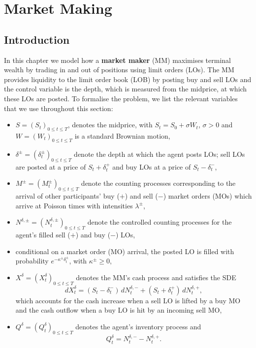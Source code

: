 \documentclass[11pt, a4paper]{book}
\begin{document}
	
	\setcounter{chapter}{9} %
	\chapter{Market Making}
	
	\section{Introduction}
	
	In this chapter we model how a \textbf{market maker} (MM) maximises terminal wealth by trading in and out of positions using limit orders (LOs). The MM provides liquidity to the limit order book (LOB) by posting buy and sell LOs and the control variable is the depth, which is measured from the midprice, at which these LOs are posted. To formalise the problem, we list the relevant variables that we use throughout this section:
	
	\begin{itemize}
		\item $S = (S_t)_{0 \leq t \leq T}$, denotes the midprice, with $S_t = S_0 + \sigma W_t$, $\sigma > 0$ and $W = (W_t)_{0 \leq t \leq T}$ is a standard Brownian motion,
		\item $\delta^\pm = (\delta^\pm_t)_{0 \leq t \leq T}$ denote the depth at which the agent posts LOs; sell LOs are posted at a price of $S_t + \delta^+_t$ and buy LOs at a price of $S_t - \delta^-_t$,
		\item $M^\pm = (M^\pm_t)_{0 \leq t \leq T}$ denote the counting processes corresponding to the arrival of other participants' buy ($+$) and sell ($-$) market orders (MOs) which arrive at Poisson times with intensities $\lambda^\pm$,
		\item $N^{\delta, \pm} = \left(N^{\delta, \pm}_t\right)_{0 \leq t \leq T}$ denote the controlled counting processes for the agent's filled sell ($+$) and buy ($-$) LOs,
		\item conditional on a market order (MO) arrival, the posted LO is filled with probability $e^{-\kappa^\pm \delta^\pm_t}$, with $\kappa^\pm \geq 0$,
		\item $X^\delta = (X^\delta_t)_{0 \leq t \leq T}$ denotes the MM's cash process and satisfies the SDE
		\begin{equation}
			dX^\delta_t = (S_t - \delta^-_t) \, dN^{\delta, -}_t + (S_t + \delta^+_t) \, dN^{\delta, +}_t, \label{eq:10.1}
		\end{equation}
		which accounts for the cash increase when a sell LO is lifted by a buy MO and the cash outflow when a buy LO is hit by an incoming sell MO,
		\item $Q^\delta = (Q^\delta_t)_{0 \leq t \leq T}$ denotes the agent's inventory process and
		\begin{equation}
			Q^\delta_t = N^{\delta, -}_t - N^{\delta, +}_t. \label{eq:10.2}
		\end{equation}
	\end{itemize}
	
\end{document}
